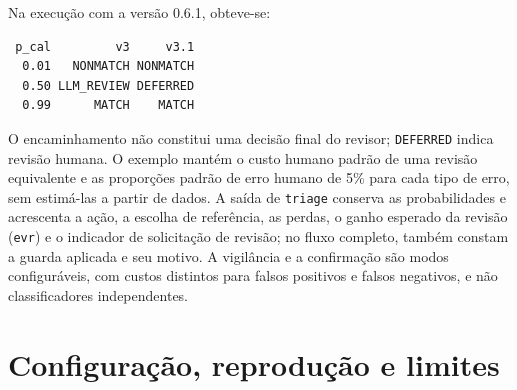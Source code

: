 Na execução com a versão 0.6.1, obteve-se:
\begin{verbatim}
 p_cal         v3     v3.1
  0.01   NONMATCH NONMATCH
  0.50 LLM_REVIEW DEFERRED
  0.99      MATCH    MATCH
\end{verbatim}

O encaminhamento não constitui uma decisão final do revisor; \texttt{DEFERRED} indica revisão humana. O exemplo mantém o custo humano padrão de uma revisão equivalente e as proporções padrão de erro humano de 5\% para cada tipo de erro, sem estimá-las a partir de dados. A saída de \texttt{triage} conserva as probabilidades e acrescenta a ação, a escolha de referência, as perdas, o ganho esperado da revisão (\texttt{evr}) e o indicador de solicitação de revisão; no fluxo completo, também constam a guarda aplicada e seu motivo. A vigilância e a confirmação são modos configuráveis, com custos distintos para falsos positivos e falsos negativos, e não classificadores independentes.

\section{Configuração, reprodução e limites}

